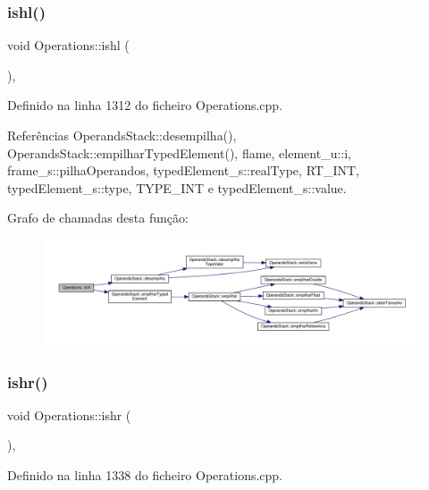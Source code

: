 \subsubsection{\texorpdfstring{ishl()}{ishl()}}
{\footnotesize\ttfamily void Operations\+::ishl (\begin{DoxyParamCaption}{ }\end{DoxyParamCaption})\hspace{0.3cm}{\ttfamily [static]}, {\ttfamily [private]}}



Definido na linha 1312 do ficheiro Operations.\+cpp.



Referências Operands\+Stack\+::desempilha(), Operands\+Stack\+::empilhar\+Typed\+Element(), flame, element\+\_\+u\+::i, frame\+\_\+s\+::pilha\+Operandos, typed\+Element\+\_\+s\+::real\+Type, R\+T\+\_\+\+I\+NT, typed\+Element\+\_\+s\+::type, T\+Y\+P\+E\+\_\+\+I\+NT e typed\+Element\+\_\+s\+::value.

Grafo de chamadas desta função\+:
\nopagebreak
\begin{figure}[H]
\begin{center}
\leavevmode
\includegraphics[width=350pt]{classOperations_a3139bbe41519fb4761ecd7e2a8ddb994_cgraph}
\end{center}
\end{figure}
\mbox{\label{classOperations_aa67d92582121939b307658d417b34d3c}} 
\subsubsection{\texorpdfstring{ishr()}{ishr()}}
{\footnotesize\ttfamily void Operations\+::ishr (\begin{DoxyParamCaption}{ }\end{DoxyParamCaption})\hspace{0.3cm}{\ttfamily [static]}, {\ttfamily [private]}}



Definido na linha 1338 do ficheiro Operations.\+cpp.



